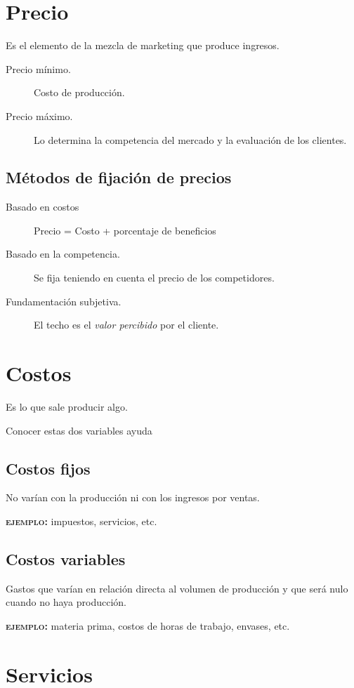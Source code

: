\documentclass[12pt, spanish, a5paper]{article}
\begin{document}
\section{Precio}

Es el elemento de la mezcla de marketing que produce ingresos.

\begin{description}
	\item[Precio mínimo.] Costo de producción.
	\item[Precio máximo.] Lo determina la competencia del mercado y la evaluación de los clientes.	
\end{description}

\subsection{Métodos de fijación de precios}

\begin{description}
	\item[Basado en costos]  Precio = Costo + porcentaje de beneficios
	\item[Basado en la competencia.] Se fija teniendo en cuenta el precio de los competidores.
	\item[Fundamentación subjetiva.] El techo es el \emph{valor percibido} por el cliente.
\end{description}


\section{Costos}
Es lo que sale producir algo.

Conocer estas dos variables ayuda


\subsection{Costos fijos}

No varían con la producción ni con los ingresos por ventas.

\textbf{\textsc{ejemplo}:} impuestos, servicios, etc.
	
\subsection{Costos variables}

Gastos que varían en relación directa al volumen de producción y que será nulo cuando no haya producción. 

\textbf{\textsc{ejemplo}:} materia prima, costos de horas de trabajo, envases, etc.


\section{Servicios}





\end{document}
